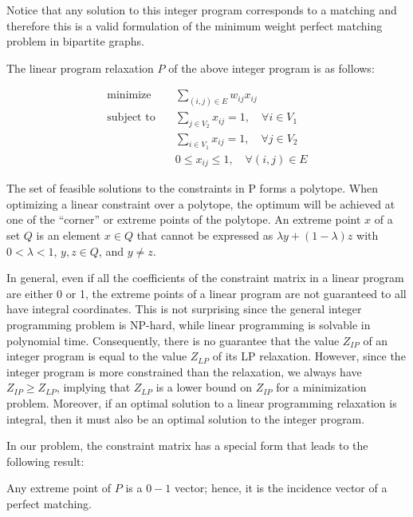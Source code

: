 Notice that any solution to this integer program corresponds to a matching and therefore this is a valid formulation of the minimum weight perfect matching problem in bipartite graphs.

The linear program relaxation $P$ of the above integer program is as follows:

\begin{equation}
    \begin{aligned}
        \text{minimize} \quad & \sum_{(i, j) \in E} w_{ij} x_{ij} \\
        \text{subject to} \quad & \sum_{j \in V_2} x_{ij} = 1, \quad \forall i \in V_1 \\
        & \sum_{i \in V_1} x_{ij} = 1, \quad \forall j \in V_2 \\
        & 0 \leq x_{ij} \leq 1, \quad \forall (i, j) \in E
    \end{aligned}
\end{equation}

The set of feasible solutions to the constraints in P forms a polytope. When optimizing a linear constraint over a polytope, the optimum will be achieved at one of the ``corner'' or extreme points of the polytope. An extreme point $x$ of a set $Q$ is an element $x \in Q$ that cannot be expressed as $\lambda y + (1 - \lambda) z$ with $0 < \lambda < 1$, $y, z \in Q$, and $y \neq z$.

In general, even if all the coefficients of the constraint matrix in a linear program are either 0 or 1, the extreme points of a linear program are not guaranteed to all have integral coordinates. This is not surprising since the general integer programming problem is NP-hard, while linear programming is solvable in polynomial time. Consequently, there is no guarantee that the value $Z_{IP}$ of an integer program is equal to the value $Z_{LP}$ of its LP relaxation. However, since the integer program is more constrained than the relaxation, we always have $Z_{IP} \geq Z_{LP}$, implying that $Z_{LP}$ is a lower bound on $Z_{IP}$ for a minimization problem. Moreover, if an optimal solution to a linear programming relaxation is integral, then it must also be an optimal solution to the integer program.

In our problem, the constraint matrix has a special form that leads to the following result: 

\begin{theorem}
    Any extreme point of $P$ is a $0-1$ vector; hence, it is the incidence vector of a perfect matching.
\end{theorem}

